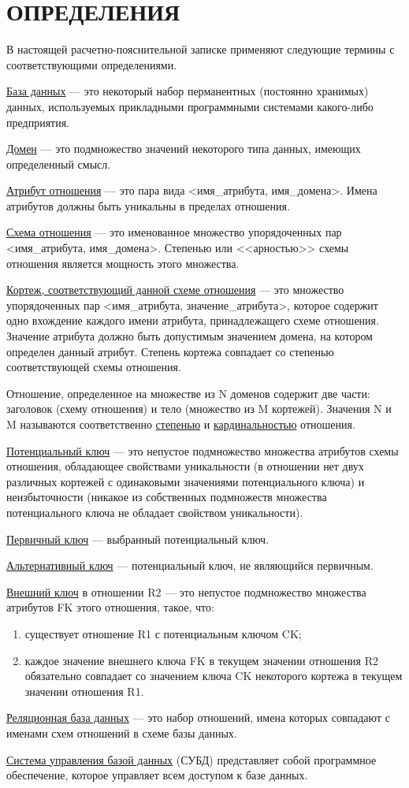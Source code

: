 \section*{ОПРЕДЕЛЕНИЯ}

В настоящей расчетно-пояснительной записке применяют следующие термины с соответствующими определениями.

\uline{База данных} --- это некоторый набор перманентных (постоянно хранимых) данных, используемых прикладными программными системами какого-либо предприятия.~\cite{date}

\uline{Домен} --- это подмножество значений некоторого типа данных, имеющих определенный смысл.~\cite{lecnotes}

\uline{Атрибут отношения} --- это пара вида <имя\_атрибута, имя\_домена>.
Имена атрибутов должны быть уникальны в пределах отношения.~\cite{lecnotes}

\uline{Схема отношения} --- это именованное множество упорядоченных пар <имя\_атрибута, имя\_домена>.
Степенью или <<арностью>> схемы отношения является мощность этого множества.~\cite{lecnotes}

\uline{Кортеж, соответствующий данной схеме отношения} --- это множество упорядоченных пар <имя\_атрибута, значение\_атрибута>, которое содержит одно вхождение каждого имени атрибута, принадлежащего схеме отношения.
Значение атрибута должно быть допустимым значением домена, на котором определен данный атрибут.
Степень кортежа совпадает со степенью соответствующей схемы отношения.~\cite{lecnotes}

Отношение, определенное на множестве из N доменов содержит две части: заголовок (схему отношения) и тело (множество из M кортежей).
Значения N и M называются соответственно \uline{степенью} и \uline{кардинальностью} отношения.~\cite{lecnotes}

\uline{Потенциальный ключ} --- это непустое подмножество множества атрибутов схемы отношения, обладающее свойствами уникальности (в отношении нет двух различных кортежей с одинаковыми значениями потенциального ключа) и неизбыточности (никакое из собственных подмножеств множества потенциального ключа не обладает свойством уникальности).~\cite{lecnotes}

\uline{Первичный ключ} --- выбранный потенциальный ключ.~\cite{lecnotes}

\uline{Альтернативный ключ} --- потенциальный ключ, не являющийся первичным.~\cite{lecnotes}

\uline{Внешний ключ} в отношении R2 --- это непустое подмножество множества атрибутов FK этого отношения, такое, что:
\begin{enumerate}[label=\asbuk*)]
    \item существует отношение R1 с потенциальным ключом CK;
    \item каждое значение внешнего ключа FK в текущем значении отношения R2 обязательно совпадает со значением ключа CK некоторого кортежа в текущем значении отношения R1.~\cite{lecnotes}
\end{enumerate}

\uline{Реляционная база данных} --- это набор отношений, имена которых совпадают с именами схем отношений в схеме базы данных.~\cite{lecnotes}

\uline{Система управления базой данных} (СУБД) представляет собой программное обеспечение, которое управляет всем доступом к базе данных.~\cite{date}
